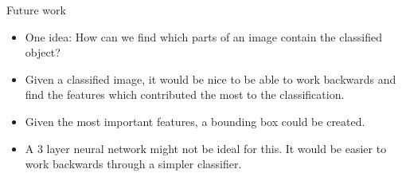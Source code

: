\documentclass{beamer}
\begin{document}
\begin{frame}{Future work}
\begin{itemize}
  \item One idea: How can we find which parts of an image contain the classified object?
  \item Given a classified image, it would be nice to be able to work
    backwards and find the features which contributed the most to the
    classification.
  \item Given the most important features, a bounding box could be created.
  \item A 3 layer neural network might not be ideal for this. It would
    be easier to work backwards through a simpler classifier.
\end{itemize}

\end{frame}
\end{document}
